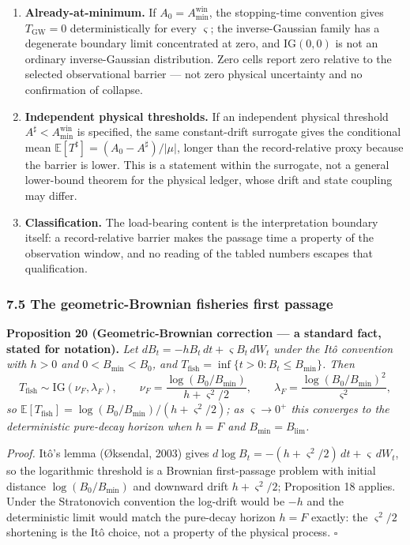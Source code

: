 \documentclass[11pt]{article}
\providecommand{\tightlist}{\setlength{\itemsep}{0pt}\setlength{\parskip}{0pt}}
\begin{document}
\begin{enumerate}
\def\labelenumi{\arabic{enumi}.}
\tightlist
\item
  \textbf{Already-at-minimum.} If \(A_0 = A_{\min}^{\mathrm{win}}\), the
  stopping-time convention gives \(T_{\mathrm{GW}} = 0\)
  deterministically for every \(\varsigma\); the inverse-Gaussian family
  has a degenerate boundary limit concentrated at zero, and
  \(\mathrm{IG}(0,0)\) is not an ordinary inverse-Gaussian distribution.
  Zero cells report zero relative to the selected observational barrier
  --- not zero physical uncertainty and no confirmation of collapse.
\item
  \textbf{Independent physical thresholds.} If an independent physical
  threshold \(A^\sharp < A_{\min}^{\mathrm{win}}\) is specified, the
  same constant-drift surrogate gives the conditional mean
  \(\mathbb{E}[T^\sharp] = (A_0 - A^\sharp)/|\mu|\), longer than the
  record-relative proxy because the barrier is lower. This is a
  statement within the surrogate, not a general lower-bound theorem for
  the physical ledger, whose drift and state coupling may differ.
\item
  \textbf{Classification.} The load-bearing content is the
  interpretation boundary itself: a record-relative barrier makes the
  passage time a property of the observation window, and no reading of
  the tabled numbers escapes that qualification.
\end{enumerate}

\subsubsection{7.5 The geometric-Brownian fisheries first
passage}\label{the-geometric-brownian-fisheries-first-passage}

\textbf{Proposition 20 (Geometric-Brownian correction --- a standard
fact, stated for notation).} \emph{Let
\(dB_t = -hB_t\, dt + \varsigma B_t\, dW_t\) under the It\^o convention
with \(h > 0\) and \(0 < B_{\min} < B_0\), and
\(T_{\mathrm{fish}} = \inf\{ t > 0 : B_t \le B_{\min} \}\). Then}
\[T_{\mathrm{fish}} \sim \mathrm{IG}(\nu_F, \lambda_F), \qquad \nu_F = \frac{\log(B_0/B_{\min})}{h + \varsigma^2/2}, \qquad \lambda_F = \frac{\log(B_0/B_{\min})^2}{\varsigma^2},\]
\emph{so
\(\mathbb{E}[T_{\mathrm{fish}}] = \log(B_0/B_{\min})/(h + \varsigma^2/2)\);
as \(\varsigma \to 0^+\) this converges to the deterministic pure-decay
horizon when \(h = F\) and \(B_{\min} = B_{\lim}\).}

\emph{Proof.} It\^o's lemma (\O{}ksendal, 2003) gives
\(d\log B_t = -(h + \varsigma^2/2)\, dt + \varsigma\, dW_t\), so the
logarithmic threshold is a Brownian first-passage problem with initial
distance \(\log(B_0/B_{\min})\) and downward drift
\(h + \varsigma^2/2\); Proposition 18 applies. Under the Stratonovich
convention the log-drift would be \(-h\) and the deterministic limit
would match the pure-decay horizon \(h = F\) exactly: the
\(\varsigma^2/2\) shortening is the It\^o choice, not a property of the
physical process. \ensuremath{\square}
\end{document}
